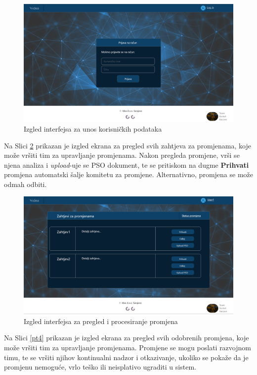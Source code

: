 \documentclass[12pt,a4paper]{article}
\begin{document}
\begin{figure}[H]
\center
\includegraphics[scale=0.4]{../res/Prototype/LogIn.PNG}
\caption{Izgled interfejsa za unos korisničkih podataka}
\label{pt2}
\end{figure}

\newpage

Na Slici \ref{pt3} prikazan je izgled ekrana za pregled svih zahtjeva za promjenama, koje može vršiti tim za upravljanje promjenama. Nakon pregleda promjene, vrši se njena analiza i \textit{upload}-uje se PSO dokument, te se pritiskom na dugme \textbf{Prihvati} promjena automatski šalje komitetu za promjene. Alternativno, promjena se može odmah odbiti.

\begin{figure}[H]
\center
\includegraphics[scale=0.4]{../res/Prototype/Zahtjev-promjene.PNG}
\caption{Izgled interfejsa za pregled i procesiranje promjena}
\label{pt3}
\end{figure}

Na Slici \ref{pt4} prikazan je izgled ekrana za pregled svih odobrenih promjena, koje može vršiti tim za upravljanje promjenama. Promjene se mogu poslati razvojnom timu, te se vršiti njihov kontinualni nadzor i otkazivanje, ukoliko se pokaže da je promjenu nemoguće, vrlo teško ili neisplativo ugraditi u sistem.
\end{document}
